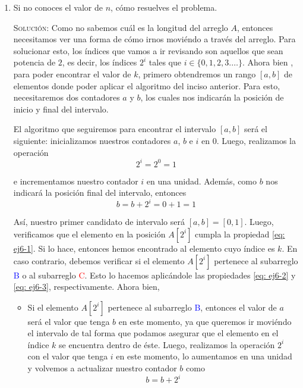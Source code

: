 \documentclass[letterpaper,11pt]{article}
\begin{document}
\begin{enumerate}
\begin{enumerate}
		\item Si no conoces el valor de $n$, cómo resuelves el problema.
        
        \textsc{Solución:} Como no sabemos cuál es la longitud del arreglo $A$, 
        entonces necesitamos ver una forma de cómo irnos moviéndo a través del 
        arreglo. Para solucionar esto, los índices que vamos a ir revisando 
        son aquellos que sean potencia de $2$, es decir, los índices $2^i$
        tales que $i \in \{0, 1, 2, 3. \ldots\}$. Ahora bien , para poder 
        encontrar el valor de $k$, primero obtendremos un rango $[a, b]$ de 
        elementos donde poder aplicar el algoritmo del inciso anterior. Para 
        esto, necesitaremos dos contadores $a$ y $b$, los cuales nos indicarán 
        la posición de inicio y final del intervalo.

        El algoritmo que seguiremos para encontrar el intervalo $[a, b]$ será 
        el siguiente: inicializamos nuestros contadores $a$, $b$ e $i$ en $0$. 
        Luego, realizamos la operación
        \begin{equation*}
            2^i = 2^0 = 1
        \end{equation*}
        
        e incrementamos nuestro contador $i$ en una unidad. Además, como $b$ 
        nos indicará la posición final del intervalo, entonces 
        \begin{equation*}
            b = b + 2^i = 0 + 1 = 1
        \end{equation*}
        
        Así, nuestro primer candidato de intervalo será $[a, b] = [0, 1]$.
        Luego, verificamos que el elemento en la posición $A[2^i]$ cumpla la 
        propiedad \ref{eq: ej6-1}. Si lo hace, entonces hemos encontrado al 
        elemento cuyo índice es $k$. En caso contrario, debemos verificar si el 
        elemento $A[2^i]$ pertenece al subarreglo \textcolor{blue}{B} o al 
        subarreglo \textcolor{red}{C}. Esto lo hacemos aplicándole las 
        propiedades \ref{eq: ej6-2} y \ref{eq: ej6-3}, respectivamente. Ahora 
        bien, 
        \begin{itemize}
            \item Si el elemento $A[2^i]$ pertenece al subarreglo 
            \textcolor{blue}{B}, entonces el valor de $a$ será el valor que 
            tenga $b$ en este momento, ya que  queremos ir moviéndo el intervalo 
            de tal forma que podamos asegurar que el elemento en el índice $k$ 
            se encuentra dentro de éste. Luego, realizamos la operación $2^i$ 
            con el valor que tenga $i$ en este momento, lo aumentamos en una 
            unidad y volvemos a actualizar nuestro contador $b$ como 
            \begin{equation*}
                b = b + 2^i
            \end{equation*}
    

\end{itemize}
\end{enumerate}
\end{enumerate}
\end{document}
